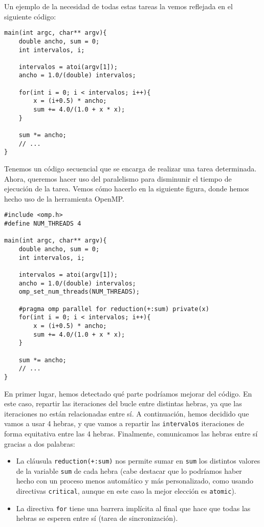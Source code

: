 Un ejemplo de la necesidad de todas estas tareas la vemos reflejada en el siguiente código:
    \begin{verbatim}
main(int argc, char** argv){
    double ancho, sum = 0;
    int intervalos, i;
    
    intervalos = atoi(argv[1]);
    ancho = 1.0/(double) intervalos;

    for(int i = 0; i < intervalos; i++){
        x = (i+0.5) * ancho;
        sum += 4.0/(1.0 + x * x);
    }

    sum *= ancho;
    // ...
}
    \end{verbatim}
\label{codigo_pi}
Tenemos un código secuencial que se encarga de realizar una tarea determinada. Ahora, queremos hacer uso del paralelismo para disminunir el tiempo de ejecución de la tarea. Vemos cómo hacerlo en la siguiente figura, donde hemos hecho uso de la herramienta OpenMP.
    \begin{verbatim}
#include <omp.h>
#define NUM_THREADS 4

main(int argc, char** argv){
    double ancho, sum = 0;
    int intervalos, i;
    
    intervalos = atoi(argv[1]);
    ancho = 1.0/(double) intervalos;
    omp_set_num_threads(NUM_THREADS);

    #pragma omp parallel for reduction(+:sum) private(x)
    for(int i = 0; i < intervalos; i++){
        x = (i+0.5) * ancho;
        sum += 4.0/(1.0 + x * x);
    }

    sum *= ancho;
    // ...
}
    \end{verbatim}
En primer lugar, hemos detectado qué parte podríamos mejorar del código. En este caso, repartir las iteraciones del bucle entre distintas hebras, ya que las iteraciones no están relacionadas entre sí. A continuación, hemos decidido que vamos a usar 4 hebras, y que vamos a repartir las \verb|intervalos| iteraciones de forma equitativa entre las 4 hebras. Finalmente, comunicamos las hebras entre sí gracias a dos palabras:
\begin{itemize}
    \item La cláusula \verb|reduction(+:sum)| nos permite sumar en \verb|sum| los distintos valores de la variable \verb|sum| de cada hebra (cabe destacar que lo podríamos haber hecho con un proceso menos automático y más personalizado, como usando directivas \verb|critical|, aunque en este caso la mejor elección es \verb|atomic|).
    \item La directiva \verb|for| tiene una barrera implícita al final que hace que todas las hebras se esperen entre sí (tarea de sincronización).
\end{itemize}

